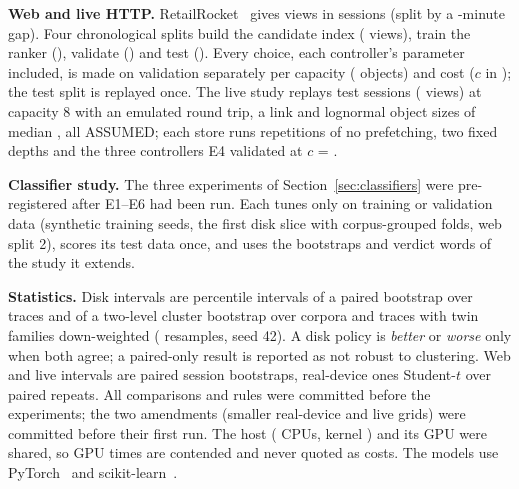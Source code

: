 \textbf{Web and live HTTP.} RetailRocket~\cite{retailrocket2017} gives
\webDataViews{} views in \webDataSessions{} sessions (split by a
\webDataSessionGapMinutes-minute gap). Four chronological splits build the
candidate index (\webDataViewsBySplitIndex{} views), train the ranker
(\webDataViewsBySplitTrain), validate (\webDataViewsBySplitValidation) and test
(\webDataViewsBySplitTest). Every choice, each controller's parameter included,
is made on validation separately per capacity (\webCapacities{} objects) and
cost ($c$ in \webCosts); the test split is replayed once. The live study
replays \liveSessions{} test sessions (\liveViews{} views) at capacity 8 with an
emulated \liveRttMs{} round trip, a \liveMbps{} link and lognormal object sizes
of median \liveSizeMedianKiB, all ASSUMED; each store runs
\liveHeadlineReps{} repetitions of no prefetching, two fixed depths and the
three controllers E4 validated at $c$ = \webHeadlineCost.

\textbf{Classifier study.} The three experiments of
Section~\ref{sec:classifiers} were pre-registered after E1--E6 had been run.
Each tunes only on training or validation data (synthetic training seeds, the
first disk slice with corpus-grouped folds, web split 2), scores its test data
once, and uses the bootstraps and verdict words of the study it extends.

\textbf{Statistics.} Disk intervals are \ciLevel{} percentile intervals of a
paired bootstrap over traces and of a two-level cluster bootstrap over corpora
and traces with twin families down-weighted (\diskBootstrapReps{} resamples,
seed 42). A disk policy is \emph{better} or \emph{worse} only when both agree;
a paired-only result is reported as not robust to clustering. Web and live
intervals are paired session bootstraps, real-device ones Student-$t$ over
paired repeats. All comparisons and rules were committed before the
experiments; the two amendments (smaller real-device and live grids) were
committed before their first run. The host (\hostCpuCount{} CPUs, kernel
\hostKernel) and its \hostGpu{} GPU were shared, so GPU times are contended and
never quoted as costs. The models use PyTorch~\cite{paszke2019pytorch} and
scikit-learn~\cite{pedregosa2011sklearn}.
